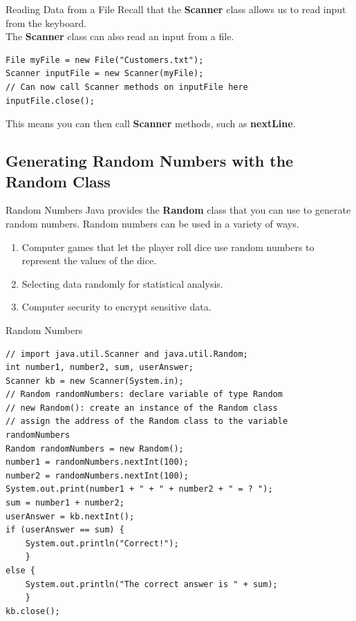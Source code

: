 \documentclass[11pt]{beamer}
\begin{document}
\begin{frame}[fragile]{Reading Data from a File}
    Recall that the \textbf{Scanner} class allows us to read input from the keyboard. \\ 
    \vspace{1em} 
    The \textbf{Scanner} class can also read an input from a file.
    \begin{lstlisting}
File myFile = new File("Customers.txt");
Scanner inputFile = new Scanner(myFile);
// Can now call Scanner methods on inputFile here
inputFile.close();
    \end{lstlisting}
This means you can then call \textbf{Scanner} methods, such as \textbf{nextLine}.
\end{frame}

\subsection{Generating Random Numbers with the Random Class}
\begin{frame}{Random Numbers}
     Java provides the \textbf{Random} class that you can use to generate random numbers. Random numbers can be used in a variety of ways.
     \begin{enumerate}
         \item Computer games that let the player roll dice use random numbers to represent the values of the dice.
         \item Selecting data randomly for statistical analysis.
         \item Computer security to encrypt sensitive data.
     \end{enumerate}
\end{frame}

\begin{frame}[fragile]{Random Numbers}
   \begin{lstlisting}[basicstyle=\ttfamily\scriptsize]
// import java.util.Scanner and java.util.Random;
int number1, number2, sum, userAnswer;
Scanner kb = new Scanner(System.in);
// Random randomNumbers: declare variable of type Random
// new Random(): create an instance of the Random class
// assign the address of the Random class to the variable randomNumbers
Random randomNumbers = new Random();
number1 = randomNumbers.nextInt(100);
number2 = randomNumbers.nextInt(100);
System.out.print(number1 + " + " + number2 + " = ? ");
sum = number1 + number2;
userAnswer = kb.nextInt();
if (userAnswer == sum) {
    System.out.println("Correct!");
    }
else {
    System.out.println("The correct answer is " + sum);
    }
kb.close();
   \end{lstlisting} 
\end{frame}
\end{document}
